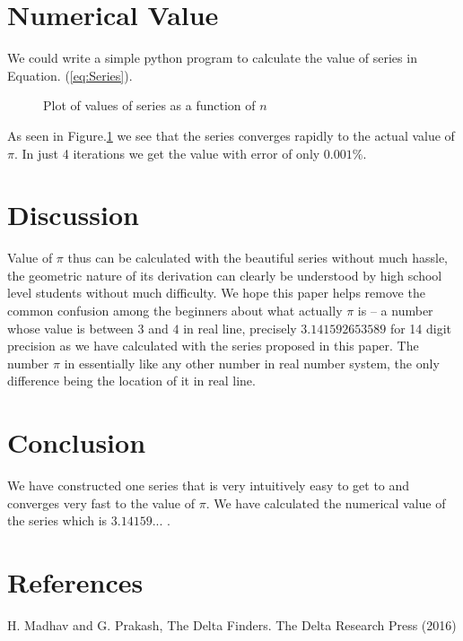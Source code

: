 \documentclass{jpconf}
\theoremstyle{definition} \newtheorem{Definition}{Def{\,}inition}
\begin{document}
\section{Numerical Value}
We could write a simple python program to calculate the value of series in Equation. (\ref{eq:Series}).

\begin{figure}[h!]
	\centering
	\scalebox{0.8}{}
	\caption{Plot of values of series as a function of $n$}
	\label{fig:PISeriesPlot}
\end{figure}
As seen in Figure.\ref{fig:PISeriesPlot} we see that the series converges rapidly to the actual value of $\pi$. In just 4 iterations we get the value with error of only $0.001\%$.
\section{Discussion}
Value of $\pi$ thus can be calculated with the beautiful series without much hassle, the geometric nature of its derivation can clearly be understood by high school level students without much difficulty.  We hope this paper helps remove the common confusion among the beginners about what actually $\pi$ is -- a number whose value is between $3$ and $4$ in real line, precisely $3.141592653589$ for 14 digit precision as we have calculated with the series proposed in this paper. The number $\pi$ in essentially like any  other number in real number system, the only difference being the location of it in real line. 

\section{Conclusion}
We have constructed one series that is very intuitively easy to get to and converges very fast to the value of $\pi$. We have calculated the numerical value of the series which is $3.14159...$ \cite{fat}.

\section*{References}
\begin{thebibliography}{99}
		H. Madhav and G. Prakash, The Delta Finders. The Delta Research Press (2016)
\end{thebibliography}
\end{document}
